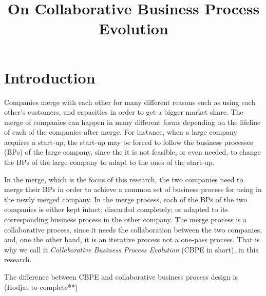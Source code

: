 \documentclass{article}
\begin{document}
\title{On Collaborative Business Process Evolution}

\date{}
\maketitle

\section{Introduction}
Companies merge with each other for many different reasons such as using each other's customers, and capacities in order to get a bigger market share.
The merge of companies can happen in many different forms depending on the lifeline of each of the companies after merge.
For instance, when a large company acquires a start-up, the start-up may be forced to follow the business processes (BPs) of the large company, since the it is not feasible, or even needed, to change the BPs of the large company to adapt to the ones of the start-up.

In the merge, which is the focus of this research, the two companies need to merge their BPs in order to achieve a common set of business process for using in the newly merged company.
In the merge process, each of the BPs of the two companies is either kept intact; discarded completely; or adapted to its corresponding business process in the other company.
The merge process is a collaborative process, since it needs the collaboration between the two companies, and, one the other hand, it is an iterative process not a one-pass process.
That is why we call it \emph{Collaborative Business Process Evolution} (CBPE in short), in this research.

The difference between CBPE and collaborative business process design is (Hodjat to complete**)
\end{document}
